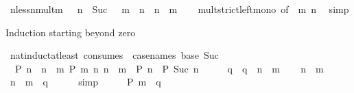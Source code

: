 \begin{isabellebody}
\ n{\isacharunderscore}{\kern0pt}less{\isacharunderscore}{\kern0pt}n{\isacharunderscore}{\kern0pt}mult{\isacharunderscore}{\kern0pt}m{\isacharcolon}{\kern0pt}\ {\isachardoublequoteopen}{}\ {\isacharless}{\kern0pt}\ n\ {\isasymLongrightarrow}\ Suc\ {}\ {\isacharless}{\kern0pt}\ m\ {\isasymLongrightarrow}\ n\ {\isacharless}{\kern0pt}\ n\ {\isacharasterisk}{\kern0pt}\ m{\isachardoublequoteclose}\isanewline
%
\isadelimproof
\ \ %
\endisadelimproof
%
\isatagproof
{}\isamarkupfalse%
\ mult{\isacharunderscore}{\kern0pt}strict{\isacharunderscore}{\kern0pt}left{\isacharunderscore}{\kern0pt}mono\ {\isacharbrackleft}{\kern0pt}of\ {}\ m\ n{\isacharbrackright}{\kern0pt}\ \isamarkupfalse%
\ simp%
\endisatagproof
{\isafoldproof}%
%
\isadelimproof
%
\endisadelimproof
%
\begin{isamarkuptext}%
Induction starting beyond zero%
\end{isamarkuptext}\isamarkuptrue%
\isamarkupfalse%
\ nat{\isacharunderscore}{\kern0pt}induct{\isacharunderscore}{\kern0pt}at{\isacharunderscore}{\kern0pt}least\ {\isacharbrackleft}{\kern0pt}consumes\ {}{\isacharcomma}{\kern0pt}\ case{\isacharunderscore}{\kern0pt}names\ base\ Suc{\isacharbrackright}{\kern0pt}{\isacharcolon}{\kern0pt}\isanewline
\ \ {\isachardoublequoteopen}P\ n{\isachardoublequoteclose}\ \ {\isachardoublequoteopen}n\ {\isasymge}\ m{\isachardoublequoteclose}\ {\isachardoublequoteopen}P\ m{\isachardoublequoteclose}\ {\isachardoublequoteopen}{\isasymAnd}n{\isachardot}{\kern0pt}\ n\ {\isasymge}\ m\ {\isasymLongrightarrow}\ P\ n\ {\isasymLongrightarrow}\ P\ {\isacharparenleft}{\kern0pt}Suc\ n{\isacharparenright}{\kern0pt}{\isachardoublequoteclose}\isanewline
%
\isadelimproof
%
\endisadelimproof
%
\isatagproof
{}\isamarkupfalse%
\ {\isacharminus}{\kern0pt}\isanewline
\ \ \isamarkupfalse%
\ q\ \ {\isachardoublequoteopen}q\ {\isacharequal}{\kern0pt}\ n\ {\isacharminus}{\kern0pt}\ m{\isachardoublequoteclose}\isanewline
\ \ \isamarkupfalse%
\ {\isacartoucheopen}n\ {\isasymge}\ m{\isacartoucheclose}\ \isamarkupfalse%
\ {\isachardoublequoteopen}n\ {\isacharequal}{\kern0pt}\ m\ {\isacharplus}{\kern0pt}\ q{\isachardoublequoteclose}\isanewline
\ \ \ \ \isamarkupfalse%
\ simp\isanewline
\ \ \isamarkupfalse%
\ \isamarkupfalse%
\ {\isachardoublequoteopen}P\ {\isacharparenleft}{\kern0pt}m\ {\isacharplus}{\kern0pt}\ q{\isacharparenright}{\kern0pt}{\isachardoublequoteclose}\isanewline

\end{isabellebody}
